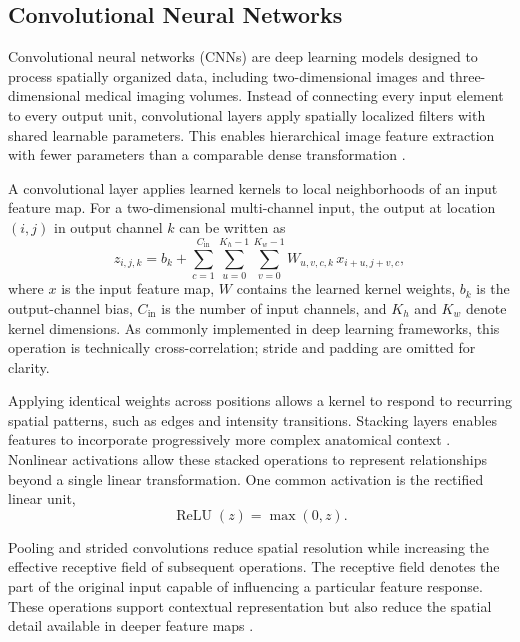 \subsection{Convolutional Neural Networks}

Convolutional neural networks (CNNs) are deep learning models designed to process spatially organized data, including two-dimensional images and three-dimensional medical imaging volumes. Instead of connecting every input element to every output unit, convolutional layers apply spatially localized filters with shared learnable parameters. This enables hierarchical image feature extraction with fewer parameters than a comparable dense transformation \autocite{lecun2015deeplearning,litjens2017survey}.

A convolutional layer applies learned kernels to local neighborhoods of an input feature map. For a two-dimensional multi-channel input, the output at location $(i,j)$ in output channel $k$ can be written as
\begin{equation}
z_{i,j,k}=b_k+\sum_{c=1}^{C_{\mathrm{in}}}\sum_{u=0}^{K_h-1}\sum_{v=0}^{K_w-1}W_{u,v,c,k}\,x_{i+u,j+v,c},
\end{equation}
where $x$ is the input feature map, $W$ contains the learned kernel weights, $b_k$ is the output-channel bias, $C_{\mathrm{in}}$ is the number of input channels, and $K_h$ and $K_w$ denote kernel dimensions. As commonly implemented in deep learning frameworks, this operation is technically cross-correlation; stride and padding are omitted for clarity.

Applying identical weights across positions allows a kernel to respond to recurring spatial patterns, such as edges and intensity transitions. Stacking layers enables features to incorporate progressively more complex anatomical context \autocite{lecun2015deeplearning}. Nonlinear activations allow these stacked operations to represent relationships beyond a single linear transformation. One common activation is the rectified linear unit,
\begin{equation}
\operatorname{ReLU}(z)=\max(0,z).
\end{equation}

Pooling and strided convolutions reduce spatial resolution while increasing the effective receptive field of subsequent operations. The receptive field denotes the part of the original input capable of influencing a particular feature response. These operations support contextual representation but also reduce the spatial detail available in deeper feature maps \autocite{litjens2017survey}.

